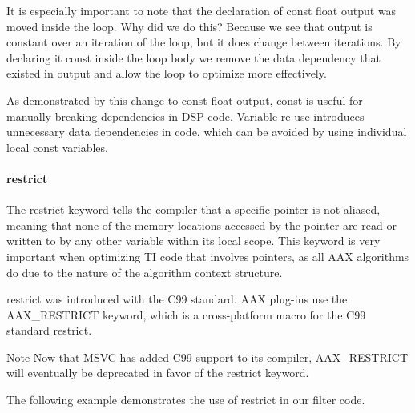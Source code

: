 It is especially important to note that the declaration of {\ttfamily const float output} was moved inside the loop. Why did we do this? Because we see that output is constant over an iteration of the loop, but it does change between iterations. By declaring it {\ttfamily const} inside the loop body we remove the data dependency that existed in output and allow the loop to optimize more effectively.

As demonstrated by this change to {\ttfamily const float output}, {\ttfamily const} is useful for manually breaking dependencies in D\+S\+P code. Variable re-\/use introduces unnecessary data dependencies in code, which can be avoided by using individual local const variables.

\hypertarget{a00362_subsubsection__restrict_}{}\paragraph{restrict}\label{a00362_subsubsection__restrict_}
 The {\ttfamily restrict} keyword tells the compiler that a specific pointer is not aliased, meaning that none of the memory locations accessed by the pointer are read or written to by any other variable within its local scope. This keyword is very important when optimizing T\+I code that involves pointers, as all A\+A\+X algorithms do due to the nature of the algorithm context structure.

{\ttfamily restrict} was introduced with the C99 standard. A\+A\+X plug-\/ins use the {\ttfamily A\+A\+X\+\_\+\+R\+E\+S\+T\+R\+I\+C\+T} keyword, which is a cross-\/platform macro for the C99 standard restrict.

\begin{DoxyNote}{Note}
Now that M\+S\+V\+C has added C99 support to its compiler, {\ttfamily A\+A\+X\+\_\+\+R\+E\+S\+T\+R\+I\+C\+T} will eventually be deprecated in favor of the {\ttfamily restrict} keyword.
\end{DoxyNote}
The following example demonstrates the use of restrict in our filter code.


